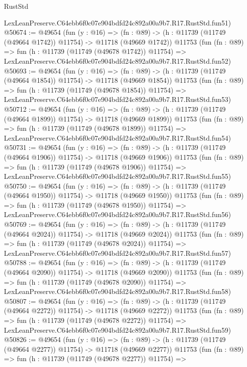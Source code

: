\begin{lexlean}{RustStd}
\begin{coremodule}
    LexLeanPreserve.C64ebb6f0c07e904bdfd24c892a00a9b7.R17.RustStd.fun51)
@50674 := @49654
    (fun (y : @16) =>
    (fn : @89) -> (h : @11739 (@11749 (@49664 @1742)) @11754) -> @11718 (@49669 @1742))
    @11753
    (fun (fn : @89) =>
    fun (h : @11739 (@11749 (@49678 @1742)) @11754) =>
    LexLeanPreserve.C64ebb6f0c07e904bdfd24c892a00a9b7.R17.RustStd.fun52)
@50693 := @49654
    (fun (y : @16) =>
    (fn : @89) -> (h : @11739 (@11749 (@49664 @1854)) @11754) -> @11718 (@49669 @1854))
    @11753
    (fun (fn : @89) =>
    fun (h : @11739 (@11749 (@49678 @1854)) @11754) =>
    LexLeanPreserve.C64ebb6f0c07e904bdfd24c892a00a9b7.R17.RustStd.fun53)
@50712 := @49654
    (fun (y : @16) =>
    (fn : @89) -> (h : @11739 (@11749 (@49664 @1899)) @11754) -> @11718 (@49669 @1899))
    @11753
    (fun (fn : @89) =>
    fun (h : @11739 (@11749 (@49678 @1899)) @11754) =>
    LexLeanPreserve.C64ebb6f0c07e904bdfd24c892a00a9b7.R17.RustStd.fun54)
@50731 := @49654
    (fun (y : @16) =>
    (fn : @89) -> (h : @11739 (@11749 (@49664 @1906)) @11754) -> @11718 (@49669 @1906))
    @11753
    (fun (fn : @89) =>
    fun (h : @11739 (@11749 (@49678 @1906)) @11754) =>
    LexLeanPreserve.C64ebb6f0c07e904bdfd24c892a00a9b7.R17.RustStd.fun55)
@50750 := @49654
    (fun (y : @16) =>
    (fn : @89) -> (h : @11739 (@11749 (@49664 @1950)) @11754) -> @11718 (@49669 @1950))
    @11753
    (fun (fn : @89) =>
    fun (h : @11739 (@11749 (@49678 @1950)) @11754) =>
    LexLeanPreserve.C64ebb6f0c07e904bdfd24c892a00a9b7.R17.RustStd.fun56)
@50769 := @49654
    (fun (y : @16) =>
    (fn : @89) -> (h : @11739 (@11749 (@49664 @2024)) @11754) -> @11718 (@49669 @2024))
    @11753
    (fun (fn : @89) =>
    fun (h : @11739 (@11749 (@49678 @2024)) @11754) =>
    LexLeanPreserve.C64ebb6f0c07e904bdfd24c892a00a9b7.R17.RustStd.fun57)
@50788 := @49654
    (fun (y : @16) =>
    (fn : @89) -> (h : @11739 (@11749 (@49664 @2090)) @11754) -> @11718 (@49669 @2090))
    @11753
    (fun (fn : @89) =>
    fun (h : @11739 (@11749 (@49678 @2090)) @11754) =>
    LexLeanPreserve.C64ebb6f0c07e904bdfd24c892a00a9b7.R17.RustStd.fun58)
@50807 := @49654
    (fun (y : @16) =>
    (fn : @89) -> (h : @11739 (@11749 (@49664 @2272)) @11754) -> @11718 (@49669 @2272))
    @11753
    (fun (fn : @89) =>
    fun (h : @11739 (@11749 (@49678 @2272)) @11754) =>
    LexLeanPreserve.C64ebb6f0c07e904bdfd24c892a00a9b7.R17.RustStd.fun59)
@50826 := @49654
    (fun (y : @16) =>
    (fn : @89) -> (h : @11739 (@11749 (@49664 @2277)) @11754) -> @11718 (@49669 @2277))
    @11753
    (fun (fn : @89) =>
    fun (h : @11739 (@11749 (@49678 @2277)) @11754) =>

\end{coremodule}
\end{lexlean}
